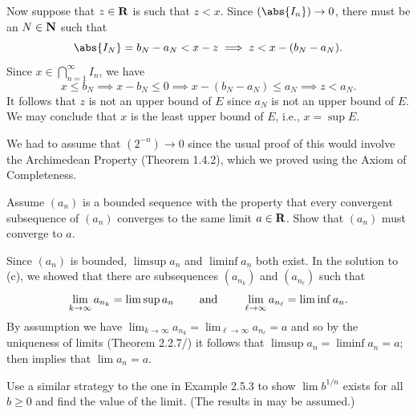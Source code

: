 \documentclass{lew98_solutions}
\begin{document}
\begin{solution}
    Now suppose that \( z \in \mathbf{R} \) is such that \( z < x \). Since \( (\abs{I_n}) \to 0 \), there must be an \( N \in \mathbf{N} \) such that
    \[
        \abs{I_N} = b_N - a_N < x - z \implies z < x - (b_N - a_N).
    \]
    Since \( x \in \bigcap_{n=1}^{\infty} I_n \), we have
    \[
        x \leq b_N \implies x - b_N \leq 0 \implies x - (b_N - a_N) \leq a_N \implies z < a_N.
    \]
    It follows that \( z \) is not an upper bound of \( E \) since \( a_N \) is not an upper bound of \( E \). We may conclude that \( x \) is the least upper bound of \( E \), i.e., \( x = \sup E \).

    We had to assume that \( (2^{-n}) \to 0 \) since the usual proof of this would involve the Archimedean Property (Theorem 1.4.2), which we proved using the Axiom of Completeness.
\end{solution}

\begin{exercise}
\label{ex:2.5.5}
    Assume \( (a_n) \) is a bounded sequence with the property that every convergent subsequence of \( (a_n) \) converges to the same limit \( a \in \mathbf{R} \). Show that \( (a_n) \) must converge to \( a \).
\end{exercise}

\begin{solution}
    Since \( (a_n) \) is bounded, \( \limsup a_n \) and \( \liminf a_n \) both exist. In the solution to  (c), we showed that there are subsequences \( (a_{n_k}) \) and \( (a_{n_{\ell}}) \) such that
    \[
        \lim_{k \to \infty} a_{n_k} = \limsup a_n \hspace{8mm} \text{and} \hspace{8mm} \lim_{\ell \to \infty} a_{n_{\ell}} = \liminf a_n.
    \]
    By assumption we have \( \lim_{k \to \infty} a_{n_k} = \lim_{\ell \to \infty} a_{n_{\ell}} = a \) and so by the uniqueness of limits (Theorem 2.2.7/) it follows that \( \limsup a_n = \liminf a_n = a \);  then implies that \( \lim a_n = a \).
\end{solution}

\begin{exercise}
\label{ex:2.5.6}
    Use a similar strategy to the one in Example 2.5.3 to show \( \lim b^{1/n} \) exists for all \( b \geq 0 \) and find the value of the limit. (The results in  may be assumed.)
\end{exercise}
\end{document}
